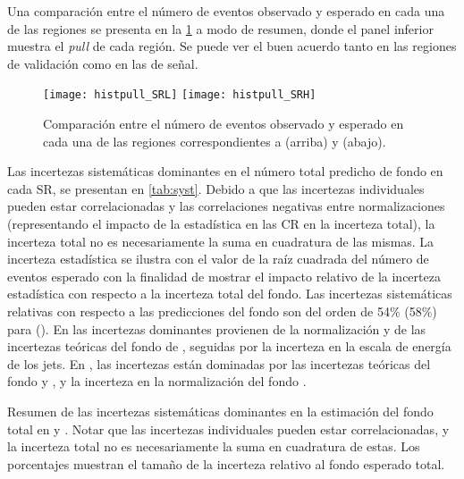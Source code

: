 Una comparación entre el número de eventos observado y esperado en cada una de las
regiones se presenta en la \cref{fig:fit_region_composition} a modo de resumen, donde
el panel inferior muestra el \emph{pull} de cada región. Se puede ver el buen acuerdo
tanto en las regiones de validación como en las de señal.


\begin{figure}[!htbp]
  \centering

  \texttt{[image: histpull\_SRL]}
  \texttt{[image: histpull\_SRH]}

  \caption{Comparación entre el número de eventos observado y esperado en cada
    una de las regiones correspondientes a {\SRL} (arriba) y {\SRH} (abajo).}

  \label{fig:fit_region_composition}

\end{figure}


Las incertezas sistemáticas dominantes en el número total predicho de fondo en
cada SR, se presentan en \cref{tab:syst}.
Debido a que las incertezas individuales pueden estar correlacionadas y las
correlaciones negativas entre normalizaciones (representando el impacto de la
estadística en las CR en la incerteza total), la incerteza total no es
necesariamente la suma en cuadratura de las mismas. La incerteza estadística se
ilustra con el valor de la raíz cuadrada del número de eventos esperado con la
finalidad de mostrar el impacto relativo de la incerteza estadística con
respecto a la incerteza total del fondo. Las incertezas sistemáticas relativas
con respecto a las predicciones del fondo son del orden de 54\% (58\%) para
{\SRL} (\SRH). En {\SRL} las incertezas dominantes provienen de la normalización
y de las incertezas teóricas del fondo de {\ttgam}, seguidas por la incerteza en
la escala de energía de los jets. En {\SRH}, las
incertezas están dominadas por las incertezas teóricas del fondo {\zgam} y
{\gjet}, y la incerteza en la normalización del fondo {\wgam}.


\begin{table}[!htbp]
  \centering

  \caption{Resumen de las incertezas sistemáticas dominantes en la estimación del fondo total
    en {\SRL} y {\SRH}. Notar que las incertezas individuales pueden estar correlacionadas, y la incerteza
    total no es necesariamente la suma en cuadratura de estas. Los porcentajes muestran el tamaño
    de la incerteza relativo al fondo esperado total.}
  \label{tab:syst}

  
\end{table}



